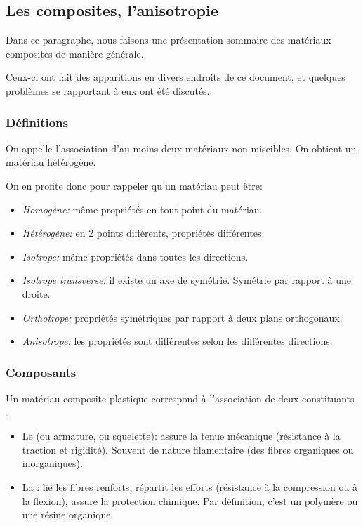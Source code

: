 \medskip
\subsection{Les composites, l'anisotropie}

Dans ce paragraphe, nous faisons une présentation sommaire des matériaux composites
de manière générale.

Ceux-ci ont fait des apparitions en divers endroits de ce document, et quelques problèmes
se rapportant à eux ont été discutés.

\medskip
\subsubsection{Définitions}

\begin{definition}
On appelle  l'association d'au moins deux matériaux non miscibles. 
On obtient un matériau hétérogène.
\end{definition}

On en profite donc pour rappeler qu'un matériau peut être:
\begin{itemize}
	\item \emph{Homogène:} même propriétés en tout point du matériau.
	\item \emph{Hétérogène:} en 2 points différents, propriétés différentes.
	\item \emph{Isotrope:} même propriétés dans toutes les directions.
	\item \emph{Isotrope transverse:} il existe un axe de symétrie. Symétrie par rapport à une droite.
	\item \emph{Orthotrope:} propriétés symétriques par rapport à deux plans orthogonaux.
	\item \emph{Anisotrope:} les propriétés sont différentes selon les différentes directions. 
\end{itemize}

\medskip
\subsubsection{Composants}

Un matériau composite plastique correspond à l'association de deux constituants .
\begin{itemize}
	\item Le  (ou armature, ou squelette): assure la tenue mécanique (résistance à la 
		traction et rigidité). Souvent de nature filamentaire (des fibres organiques ou inorganiques).
	\item La : lie les fibres renforts, répartit les efforts (résistance à la compression 
		ou à la flexion), assure la protection chimique. Par définition, c'est un polymère ou 
		une résine organique.
\end{itemize}

